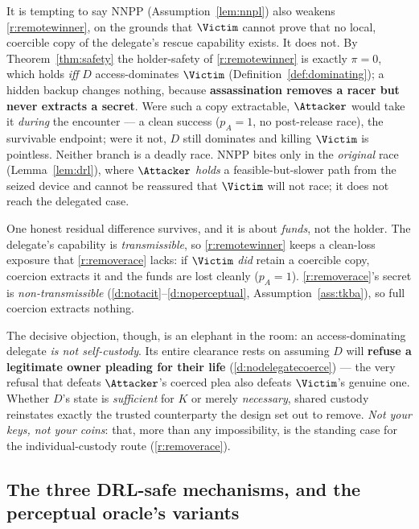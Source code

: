 \begin{remark}\label{rem:r2-cost}
It is tempting to say NNPP (Assumption~\ref{lem:nnpl}) also weakens
\ref{r:remotewinner}, on the grounds that $\Victim$ cannot prove that no local,
coercible copy of the delegate's rescue capability exists. It does not. By
Theorem~\ref{thm:safety} the holder-safety of \ref{r:remotewinner} is exactly
$\pi = 0$, which holds \emph{iff} $D$ access-dominates $\Victim$
(Definition~\ref{def:dominating}); a hidden backup changes nothing, because
\textbf{assassination removes a racer but never extracts a secret}. Were such a
copy extractable, $\Attacker$ would take it \emph{during} the encounter --- a clean
success ($p_A = 1$, no post-release race), the survivable endpoint; were it not,
$D$ still dominates and killing $\Victim$ is pointless. Neither branch is a deadly
race. NNPP bites only in the \emph{original} race (Lemma~\ref{lem:drl}), where
$\Attacker$ \emph{holds} a feasible-but-slower path from the seized device and
cannot be reassured that $\Victim$ will not race; it does not reach the delegated
case.

One honest residual difference survives, and it is about \emph{funds}, not the
holder. The delegate's capability is \emph{transmissible}, so \ref{r:remotewinner}
keeps a clean-loss exposure that \ref{r:removerace} lacks: if $\Victim$ \emph{did}
retain a coercible copy, coercion extracts it and the funds are lost cleanly
($p_A = 1$). \ref{r:removerace}'s secret is \emph{non-transmissible}
(\ref{d:notacit}--\ref{d:noperceptual}, Assumption~\ref{ass:tkba}), so full
coercion extracts nothing.

The decisive objection, though, is an elephant in the room: an access-dominating
delegate \emph{is not self-custody}. Its entire clearance rests on assuming $D$
will \textbf{refuse a legitimate owner pleading for their life}
(\ref{d:nodelegatecoerce}) --- the very refusal that defeats
$\Attacker$'s coerced plea also defeats $\Victim$'s genuine one. Whether $D$'s
state is \emph{sufficient} for $K$ or merely \emph{necessary}, shared custody
reinstates exactly the trusted counterparty the design set out to remove.
\emph{Not your keys, not your coins}: that, more than any impossibility, is the
standing case for the individual-custody route (\ref{r:removerace}).
\end{remark}

\subsection{The three DRL-safe mechanisms, and the perceptual oracle's variants}
\label{app:chain-routes}

